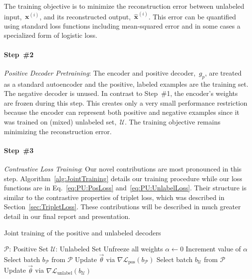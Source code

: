 \documentclass[10pt]{article}
\newcommand{\xI}[1]{\mathbf{x}^{(#1)}}
\newcommand{\xPred}[1]{\mathbf{\hat{x}}^{\left(#1\right)}}
\newcommand{\pLoss}{\mathcal{L}_{\text{pos}}}
\newcommand{\uLoss}{\mathcal{L}_{\text{unlabel}}}
\begin{document}
The training objective is to minimize the reconstruction error between unlabeled input,~$\xI{i}$, and its reconstructed output,~$\xPred{i}$. This error can be quantified using standard loss functions including mean-squared error and in some cases a specialized form of logistic loss.

\paragraph{Step~\#2} \textit{Positive Decoder Pretraining}: The encoder and positive decoder,~$g_p$, are treated as a standard autoencoder and the positive, labeled examples are the training set.  The negative decoder is unused.  In contrast to Step~\#1, the encoder's weights are frozen during this step.  This creates only a very small performance restriction because the encoder can represent both positive and negative examples since it was trained on (mixed) unlabeled set,~$\mathcal{U}$.  The training objective remains minimizing the reconstruction error.

\paragraph{Step~\#3} \textit{Contrastive Loss Training}: Our novel contributions are most pronounced in this step.  Algorithm~\ref{alg:JointTraining} details our training procedure while our loss functions are in Eq.~\eqref{eq:PU:PosLoss} and~\ref{eq:PU:UnlabelLoss}.  Their structure is similar to the contrastive properties of triplet loss, which was described in Section~\ref{sec:TripletLoss}.  These contributions will be described in much greater detail in our final report and presentation.

\begin{algorithm}[t]
  \caption{Joint training of the positive and unlabeled decoders}\label{alg:JointTraining}
  \begin{algorithmic}[1]
    \State $\mathcal{P}$: Positive Set
    \State $\mathcal{U}$: Unlabeled Set
    \State Unfreeze all weights
    \State $\alpha\gets 0$
      \State Increment value of $\alpha$ 
        \State Select batch $b_{\mathcal{P}}$ from $\mathcal{P}$
        \State Update $\vec{\theta}$ via $\nabla\pLoss(b_{\mathcal{P}})$
        \State Select batch $b_{\mathcal{U}}$ from $\mathcal{P}$
        \State Update $\vec{\theta}$ via $\nabla\uLoss(b_{\mathcal{U}})$
      \EndWhile
    \EndWhile
  \end{algorithmic}
\end{algorithm}
\end{document}
